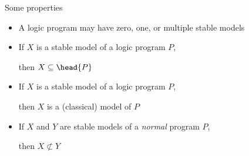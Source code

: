 \begin{frame}{Some properties}
  \bigskip
  \bigskip
  \begin{itemize}
  \item<1-> A logic program may have zero, one, or multiple stable models
    \medskip
    \medskip
  \item<3-> If $X$ is a stable model of a logic program $P$,

    then $X\subseteq\head{P}$
    \medskip
  \item<3-> If $X$ is a stable model of a logic program $P$,

    then $X$ is a (classical) model of $P$
    \medskip
  \item<4-> If $X$ and $Y$ are stable models of a \emph{normal} program $P$,

    then $X\not\subset Y$
  \end{itemize}
\end{frame}
%

